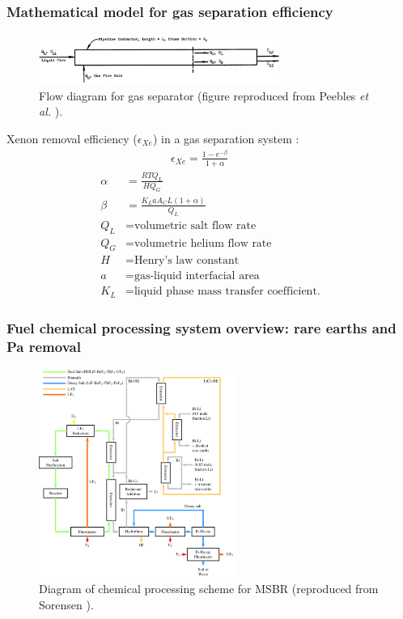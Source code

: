 \begin{frame}
  \frametitle{Mathematical model for gas separation efficiency}
  		\vspace{-3mm}
  \begin{figure}[t]
   \includegraphics[width=0.7\textwidth]{./images/pipeline_contactor.png}
   		\vspace{-2mm}
   \caption{Flow diagram for gas separator (figure reproduced from Peebles 
   \emph{et al.} \cite{peebles_removal_1968}).}
    \end{figure}
		\vspace{-2mm}
Xenon removal efficiency ($\epsilon_{Xe}$) in a gas separation system  
\cite{peebles_removal_1968}:
\begin{align}
& \qquad\qquad \epsilon_{Xe} = \frac{1-e^{-\beta}}{1+\alpha} \nonumber \\
\alpha &= \frac{RTQ_{L}}{HQ_{G}} \nonumber \\
\beta &= \frac{K_L a A_C L (1+\alpha)}{Q_{L}} \nonumber \\
Q_{L}&= \mbox{volumetric salt flow rate} \nonumber \\
Q_{G}&= \mbox{volumetric helium flow rate} \nonumber \\
H &= \mbox{Henry's law constant} \nonumber \\
a &= \mbox{gas-liquid interfacial area} \nonumber \\
K_L &= \mbox{liquid phase mass transfer coefficient.} \nonumber
\end{align}

\end{frame}

\begin{frame}
\frametitle{Fuel chemical processing system overview: rare earths and 
Pa removal}
	\begin{figure}[htp!] %
		\centering
			\includegraphics[width=0.57\textwidth]{../figures/flowsheet.pdf}
			\vspace{-2mm}
		\caption{Diagram of chemical processing scheme for \gls{MSBR} 
		(reproduced from Sorensen \cite{sorensen_one-fluid_2006}).} 
	\end{figure}
	
\end{frame}
